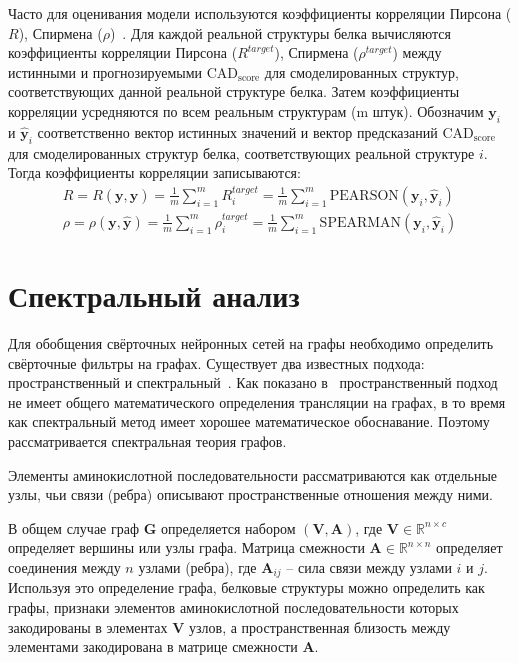 \documentclass[14pt]{extarticle}
\begin{document}
Часто для оценивания модели используются коэффициенты корреляции Пирсона ($R$), Спирмена ($\rho$)~\cite{3DCNN, Baldassarre2019GraphQAPM, 10.1093/bioinformatics/btz122}. Для каждой реальной структуры белка вычисляются коэффициенты корреляции Пирсона ($R^{target}$), Спирмена ($\rho^{target}$) между истинными и прогнозируемыми $\text{CAD}_\text{score}$ для смоделированных структур, соответствующих данной реальной структуре белка. Затем коэффициенты корреляции усредняются по всем реальным структурам (m штук). Обозначим $\mathbf{y}_i$ и $\mathbf{\hat{y}}_i$ соответственно вектор истинных значений и вектор предсказаний $\text{CAD}_\text{score}$ для смоделированных структур белка, соответствующих реальной структуре $i$. Тогда коэффициенты корреляции записываются:
$$\begin{aligned}
R = R\left(\mathbf{y}, \mathbf{\hat{y}}\right) = \frac{1}{m} \sum_{i=1}^{m} R^{target}_i=\frac{1}{m} \sum_{i=1}^{m} \text{PEARSON} \left(\mathbf{y}_i,\mathbf{\hat{y}}_i\right) \\ 
\rho= \rho\left(\mathbf{y}, \mathbf{\hat{y}}\right) = \frac{1}{m} \sum_{i=1}^{m} \rho^{target}_i = \frac{1}{m} \sum_{i=1}^{m} \text{SPEARMAN} \left(\mathbf{y}_i,\mathbf{\hat{y}}_i\right)
\end{aligned}$$


\section{Спектральный анализ}

Для обобщения свёрточных нейронных сетей на графы необходимо определить свёрточные фильтры на графах. Существует два известных подхода: пространственный и спектральный~\cite{DBLP:journals/corr/abs-1901-00596, DBLP:journals/corr/abs-1812-08434}. Как показано в~\cite{ae482107de73461787258f805cf8f4ed} пространственный подход не имеет общего математического определения трансляции на графах, в то время как  спектральный метод имеет хорошее математическое обоснавание. Поэтому рассматривается спектральная теория графов.

Элементы аминокислотной последовательности рассматриваются как отдельные узлы, чьи связи (ребра) описывают пространственные отношения между ними. 

В общем случае граф $\mathbf{G}$ определяется набором $\mathbf{(V, A)}$, где $\mathbf{V}\in \mathbb{R}^{n \times c}$ определяет вершины или узлы графа. Матрица смежности $\mathbf{A}\in \mathbb{R}^{n \times n}$ определяет соединения между $n$ узлами (ребра), где $\mathbf{A}_{ij}$ – сила связи между узлами $i$ и $j$. Используя это определение графа, белковые структуры можно определить как графы, признаки элементов аминокислотной последовательности которых закодированы в элементах $\mathbf{V}$ узлов, а пространственная близость между элементами закодирована в матрице смежности $\mathbf{A}$.
\end{document}
